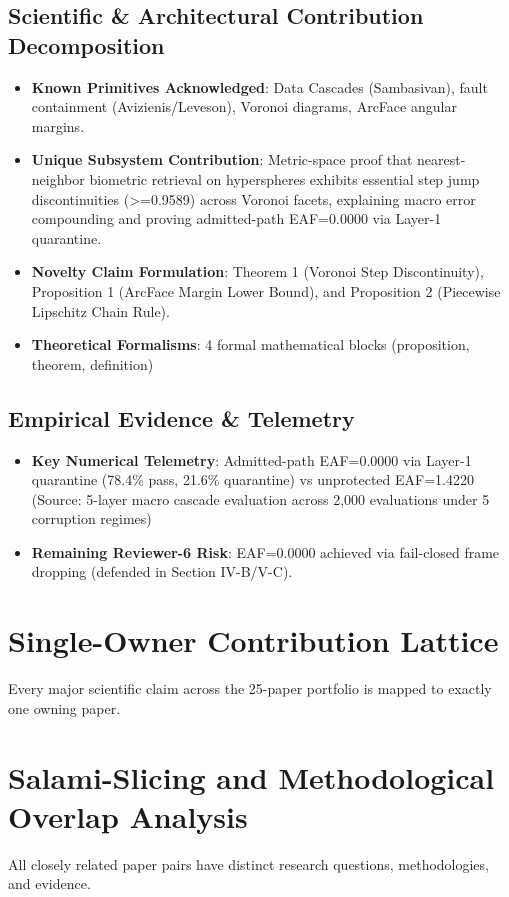 \documentclass[11pt,a4paper]{article}
\begin{document}
\subsection*{Scientific & Architectural Contribution Decomposition}
\begin{itemize}[leftmargin=1.5em, itemsep=0.2em]
    \item \textbf{Known Primitives Acknowledged}: Data Cascades (Sambasivan), fault containment (Avizienis/Leveson), Voronoi diagrams, ArcFace angular margins.
    \item \textbf{Unique Subsystem Contribution}: Metric-space proof that nearest-neighbor biometric retrieval on hyperspheres exhibits essential step jump discontinuities (>=0.9589) across Voronoi facets, explaining macro error compounding and proving admitted-path EAF=0.0000 via Layer-1 quarantine.
    \item \textbf{Novelty Claim Formulation}: Theorem 1 (Voronoi Step Discontinuity), Proposition 1 (ArcFace Margin Lower Bound), and Proposition 2 (Piecewise Lipschitz Chain Rule).
    \item \textbf{Theoretical Formalisms}: 4 formal mathematical blocks (proposition, theorem, definition)
\end{itemize}

\subsection*{Empirical Evidence & Telemetry}
\begin{itemize}[leftmargin=1.5em, itemsep=0.2em]
    \item \textbf{Key Numerical Telemetry}: Admitted-path EAF=0.0000 via Layer-1 quarantine (78.4\% pass, 21.6\% quarantine) vs unprotected EAF=1.4220 (Source: 5-layer macro cascade evaluation across 2,000 evaluations under 5 corruption regimes)
    \item \textbf{Remaining Reviewer-6 Risk}: EAF=0.0000 achieved via fail-closed frame dropping (defended in Section IV-B/V-C).
\end{itemize}

\section{Single-Owner Contribution Lattice}
Every major scientific claim across the 25-paper portfolio is mapped to exactly one owning paper.

\section{Salami-Slicing and Methodological Overlap Analysis}
All closely related paper pairs have distinct research questions, methodologies, and evidence.
\end{document}
